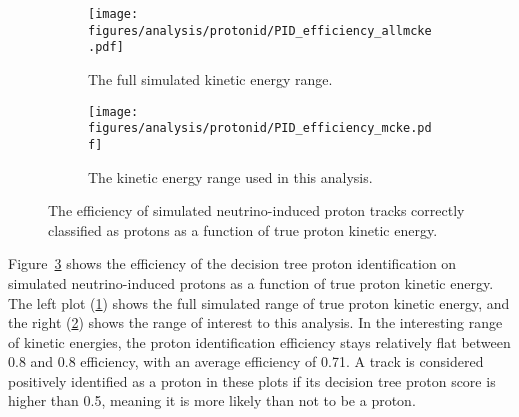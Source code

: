     \begin{figure}[h]
      \centering
      \begin{subfigure}[t]{2.5in}
        \texttt{[image: figures/analysis/protonid/PID\_efficiency\_allmcke.pdf]}
        \caption{The full simulated kinetic energy range.}
        \label{fig:pideffkeall}
      \end{subfigure}
      \hspace{2pt}
      \begin{subfigure}[t]{2.5in}
        \texttt{[image: figures/analysis/protonid/PID\_efficiency\_mcke.pdf]}
        \caption{The kinetic energy range used in this analysis.}
        \label{fig:pideffkerng}
      \end{subfigure}
      \caption{The efficiency of simulated neutrino-induced proton tracks
        correctly classified as protons as a function of true proton kinetic energy.}
      \label{fig:pideffke}
    \end{figure}
    Figure~\ref{fig:pideffke} shows the efficiency of the decision tree proton
    identification on simulated neutrino-induced protons as a function of true
    proton kinetic energy. The left plot (\ref{fig:pideffkeall}) shows the full
    simulated range of true proton kinetic energy, and the right
    (\ref{fig:pideffkerng}) shows the range of interest to this analysis. In
    the interesting range of kinetic energies, the proton identification
    efficiency stays relatively flat between 0.8 and 0.8 efficiency, with an
    average efficiency of 0.71. A track is considered positively identified as
    a proton in these plots if its decision tree proton score is higher than
    0.5, meaning it is more likely than not to be a proton.

